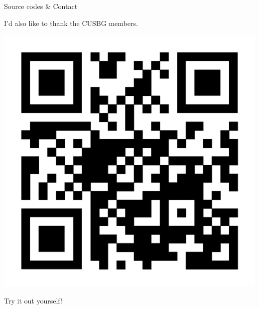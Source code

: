 \documentclass[portrait,a0paper,fontscale=0.25]{baposter}
\begin{document}
\begin{poster}
\begin{posterbox}[column=1, name=conclusion, below=result2, bottomaligned=tech]{Source codes \& Contact}
\begin{minipage}[t]{\linewidth}
\begin{minipage}[t]{0.75\linewidth}
		I'd also like to thank the CUSBG members.
	\end{minipage}
	\quad
	\begin{minipage}[t]{0.20\linewidth}
		\vspace{-2ex}
		\includegraphics[width=1\linewidth]{./img/qr_prankweb_cz.png} %
		\begin{center}
			Try it out yourself!
		\end{center}
	\end{minipage}
\end{minipage}


\end{posterbox}

\end{poster}
\end{document}
